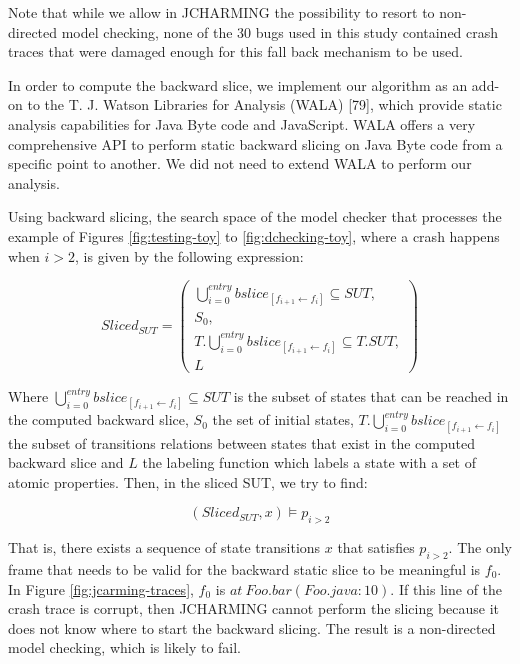 \documentclass[12pt]{report}
\begin{document}
Note that while we allow in JCHARMING the possibility to resort to
non-directed model checking, none of the 30 bugs used in this study
contained crash traces that were damaged enough for this fall back
mechanism to be used.

In order to compute the backward slice, we implement our algorithm as an
add-on to the T. J. Watson Libraries for Analysis (WALA) {[}79{]}, which
provide static analysis capabilities for Java Byte code and JavaScript.
WALA offers a very comprehensive API to perform static backward slicing
on Java Byte code from a specific point to another. We did not need to
extend WALA to perform our analysis.

Using backward slicing, the search space of the model checker that
processes the example of Figures \ref{fig:testing-toy} to
\ref{fig:dchecking-toy}, where a crash happens when \(i>2\), is given by
the following expression:

\begin{equation}
Sliced_{SUT} =
\begin{pmatrix}
\bigcup_{i=0}^{entry} bslice_{[f_{i+1} \leftarrow f_i]} \subseteq SUT, \\
S_0, \\
T.\bigcup_{i=0}^{entry} bslice_{[f_{i+1} \leftarrow f_i]}  \subseteq T.SUT, \\
L
\end{pmatrix}
\end{equation}

Where
\(\bigcup_{i=0}^{entry} bslice_{[f_{i+1} \leftarrow f_i]} \subseteq SUT\)
is the subset of states that can be reached in the computed backward
slice, \(S_0\) the set of initial states,
\(T.\bigcup_{i=0}^{entry} bslice_{[f_{i+1} \leftarrow f_i]}\) the subset
of transitions relations between states that exist in the computed
backward slice and \(L\) the labeling function which labels a state with
a set of atomic properties. Then, in the sliced SUT, we try to find:

\begin{equation}
    (Sliced_{SUT}, x) \models p_{i>2}
\end{equation}

That is, there exists a sequence of state transitions \(x\) that
satisfies \(p_{i>2}\). The only frame that needs to be valid for the
backward static slice to be meaningful is \(f_0\). In Figure
\ref{fig:jcarming-traces}, \(f_0\) is \(at~Foo.bar(Foo.java:10)\). If
this line of the crash trace is corrupt, then JCHARMING cannot perform
the slicing because it does not know where to start the backward
slicing. The result is a non-directed model checking, which is likely to
fail.
\end{document}
